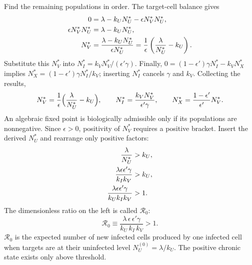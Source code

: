 Find the remaining populations in order. The target-cell balance gives
\begin{align}
0&=\lambda-k_UN_U^*-\epsilon N_V^*N_U^*,\notag\\
\epsilon N_V^*N_U^*&=\lambda-k_UN_U^*,\notag\\
N_V^*&=\frac{\lambda-k_UN_U^*}{\epsilon N_U^*}
=\frac1\epsilon\left(\frac\lambda{N_U^*}-k_U\right).\label{eq:lec02:fixed-V-steps}
\end{align}
Substitute this $N_V^*$ into $N_I^*=k_VN_V^*/(\epsilon'\gamma)$. Finally, $0=(1-\epsilon')\gamma N_I^*-k_VN_X^*$ implies $N_X^*=(1-\epsilon')\gamma N_I^*/k_V$; inserting $N_I^*$ cancels $\gamma$ and $k_V$. Collecting the results,
\begin{equation}\label{eq:lec02:fixed-rest}
N_V^*=\frac{1}{\epsilon}\Bigl(\frac{\lambda}{N_U^*}-k_U\Bigr),
\qquad
N_I^*=\frac{k_VN_V^*}{\epsilon'\gamma},
\qquad
N_X^*=\frac{1-\epsilon'}{\epsilon'}N_V^*.
\end{equation}
An algebraic fixed point is biologically admissible only if its populations are nonnegative. Since $\epsilon>0$, positivity of $N_V^*$ requires a positive bracket. Insert the derived $N_U^*$ and rearrange only positive factors:
\begin{align}
\frac{\lambda}{N_U^*}&>k_U,\notag\\
\frac{\lambda\epsilon\epsilon'\gamma}{k_Ik_V}&>k_U,\notag\\
\frac{\lambda\epsilon\epsilon'\gamma}{k_Uk_Ik_V}&>1.\label{eq:lec02:threshold-steps}
\end{align}
The dimensionless ratio on the left is called $\mathcal R_0$:
\begin{equation}\label{eq:lec02:R0}
\boxed{\mathcal R_0\equiv\frac{\lambda\,\epsilon\,\epsilon'\gamma}{k_U\,k_I\,k_V}>1.}
\end{equation}
$\mathcal R_0$ is the expected number of new infected cells produced by one infected cell when targets are at their uninfected level $N_U^{(0)}=\lambda/k_U$. The positive chronic state exists only above threshold.


